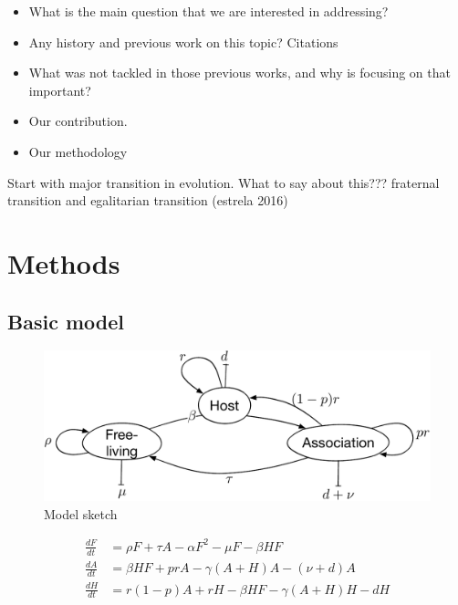 \documentclass[11pt]{article}
\begin{document}

\begin{itemize}
	\item What is the main question that we are interested in addressing?
	\item Any history and previous work on this topic? Citations
	\item What was not tackled in those previous works, and why is focusing on that important?
	\item Our contribution.
	\item Our methodology
\end{itemize}

Start with major transition in evolution. What to say about this??? fraternal transition and egalitarian transition (estrela 2016)
\section*{Methods}

\subsection*{Basic model}

\begin{figure}[ht]
	\includegraphics[width=\linewidth]{model_sketch}
	\caption{Model sketch}
	\label{Fig:model_sketch}
\end{figure}

\begin{align}
	\frac{dF}{dt}     & = \rho F +\tau A - \alpha F^2 - \mu F - \beta H F \\
	\frac{dA}{dt}    & = \beta H F +  p r A - \gamma (A + H) A - (\nu + d)  A \\
	\frac{dH}{dt}    & = r (1 - p) A + r  H -\beta H F   - \gamma (A + H) H - d H 
\end{align}
\end{document}
